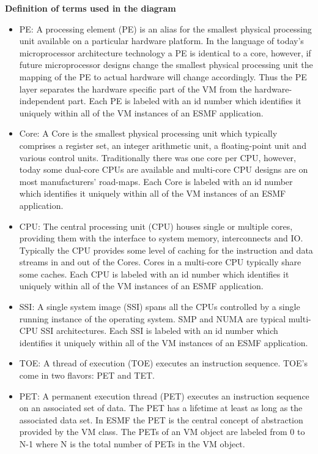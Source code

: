 {\bf Definition of terms used in the diagram}

\begin{itemize}

\item PE: A processing element (PE) is an alias for the smallest physical processing unit available on a particular hardware platform. In the language of today's microprocessor architecture technology a PE is identical to a core, however, if future microprocessor designs change the smallest physical processing unit the mapping of the PE to actual hardware will change accordingly. Thus the PE layer separates the hardware specific part of the VM from the hardware-independent part. Each PE is labeled with an id number which identifies it uniquely within all of the VM instances of an ESMF application.

\item Core: A Core is the smallest physical processing unit which typically comprises a register set, an integer arithmetic unit, a floating-point unit and various control units. Traditionally there was one core per CPU, however, today some dual-core CPUs are available and  multi-core CPU designs are on most manufacturers' road-maps. Each Core is labeled with an id number which identifies it uniquely within all of the VM instances of an ESMF application.

\item CPU: The central processing unit (CPU) houses single or multiple cores, providing them with the interface to system memory, interconnects and IO. Typically the CPU provides some level of caching for the instruction and data streams in and out of the Cores. Cores in a multi-core CPU typically share some caches. Each CPU is labeled with an id number which identifies it uniquely within all of the VM instances of an ESMF application.

\item SSI: A single system image (SSI) spans all the CPUs controlled by a single running instance of the operating system. SMP and NUMA are typical multi-CPU SSI architectures. Each SSI is labeled with an id number which identifies it uniquely within all of the VM instances of an ESMF application.

\item TOE: A thread of execution (TOE) executes an instruction sequence. TOE's come in two flavors: PET and TET.

\item PET: A permanent execution thread (PET) executes an instruction sequence on an associated set of data. The PET has a lifetime at least as long as the associated data set. In ESMF the PET is the central concept of abstraction provided by the VM class. The PETs of an VM object are labeled from 0 to N-1 where N is the total number of PETs in the VM object.


\end{itemize}
